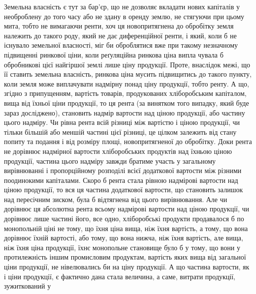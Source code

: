 Земельна власність є тут за бар’єр, що не дозволяє вкладати нових капіталів
у необроблену до того часу або не здану в оренду землю, не стягуючи
при цьому мита, тобто не вимагаючи ренти, хоч ця новопритягнена до обробітку
земля належить до такого роду, який не дає диференційної ренти, і який, коли б не існувало земельної
власності, міг би оброблятися вже при такому незначному підвищенні ринкової ціни, коли реґуляційна
ринкова ціна випла чувала б обробникові цієї найгіршої землі лише ціну продукції. Проте, внаслідок
межі, що її ставить земельна власність, ринкова ціна мусить підвищитись до такого пункту, коли земля
може виплачувати надмірну понад ціну продукції, тобто ренту. А що, згідно з припущенням, вартість
товарів, продукованих хліборобським капіталом, вища від їхньої ціни продукції, то ця рента (за
винятком того випадку, який буде зараз досліджено), становить надмір вартости над ціною продукції,
або частину цього надміру. Чи рівна рента всій різниці між вартістю і ціною продукції, чи тільки
більшій або меншій частині цієї різниці, це цілком залежить від стану попиту та подання і від
розміру площі, новопритягненої до обробітку. Доки рента не дорівнює надмірної вартости хліборобських
продуктів над їхньою ціною продукції, частина цього надміру завжди братиме участь у загальному
вирівнюванні і пропорційному розподілі всієї додаткової вартости між різними поодинокими капіталами.
Скоро б рента стала рівною надмірові вартости над ціною продукції, то вся ця частина додаткової
вартости, що становить залишок над пересічним зиском, була б відтягнена від цього вирівнювання. Але
чи дорівнює ця абсолютна рента всьому надмірові вартости над ціною продукції, чи дорівнює лише
частині його, все
одно, хліборобські продукти продавалося б по монопольній ціні не тому, що
їхня ціна вища, ніж їхня вартість, а тому, що вона дорівнює їхній вартості,
або тому, що вона нижча, ніж їхня вартість, але вища, ніж їхня ціна продукції, їхнє монопольне
становище було б у тому, що вони у
протилежність іншим промисловим продуктам, вартість яких вища від загальної ціни продукції, не
нівелювались би на ціну продукції. А що частина вартости, як і ціни продукції, є фактично дана стала
величина, а саме, витрати продукції, зужиткований у
\parbreak{}  %
